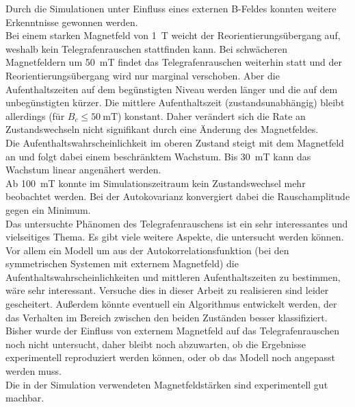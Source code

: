 \documentclass[main.tex]{subfiles}
\begin{document}
Durch die Simulationen unter Einfluss eines externen B-Feldes konnten weitere Erkenntnisse gewonnen werden.\\
Bei einem starken Magnetfeld von \SI{1}{\tesla} weicht der Reorientierungsübergang auf, weshalb kein Telegrafenrauschen stattfinden kann. Bei schwächeren Magnetfeldern um \SI{50}{\milli\tesla} findet das Telegrafenrauschen weiterhin statt und der Reorientierungsübergang wird nur marginal verschoben. Aber die Aufenthaltszeiten auf dem begünstigten Niveau werden länger und die auf dem unbegünstigten kürzer. Die mittlere Aufenthaltszeit (zustandsunabhängig) bleibt allerdings (für \(B_c \leq \SI{50}{\milli\tesla}\)) konstant. Daher verändert sich die Rate an Zustandswechseln nicht signifikant durch eine Änderung des Magnetfeldes.\\
Die Aufenthaltswahrscheinlichkeit im oberen Zustand steigt mit dem Magnetfeld an und folgt dabei einem beschränktem Wachstum. Bis \SI{30}{\milli\tesla} kann das Wachstum linear angenähert werden.\\ 
Ab \SI{100}{\milli\tesla} konnte im Simulationszeitraum kein Zustandswechsel mehr beobachtet werden. Bei der Autokovarianz konvergiert dabei die Rauschamplitude gegen ein Minimum. \\


Das untersuchte Phänomen des Telegrafenrauschens ist ein sehr interessantes und vielseitiges Thema. Es gibt viele weitere Aspekte, die untersucht werden können.\\
Vor allem ein Modell um aus der Autokorrelationsfunktion (bei den symmetrischen Systemen mit externem Magnetfeld) die Aufenthaltswahrscheinlichkeiten und mittleren Aufenthaltszeiten zu bestimmen, wäre sehr interessant. Versuche dies in dieser Arbeit zu realisieren sind leider gescheitert.
Außerdem könnte eventuell ein Algorithmus entwickelt werden, der das Verhalten im Bereich zwischen den beiden Zuständen besser klassifiziert.\\

Bisher wurde der Einfluss von externem Magnetfeld auf das Telegrafenrauschen noch nicht untersucht, daher bleibt noch abzuwarten, ob die Ergebnisse experimentell reproduziert werden können, oder ob das Modell noch angepasst werden muss.\\
Die in der Simulation verwendeten Magnetfeldstärken sind experimentell gut machbar. 
\end{document}
